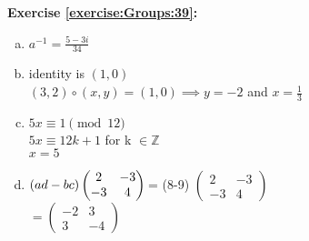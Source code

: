 \noindent\textbf{Exercise \ref{exercise:Groups:39}:}\\
\begin{enumerate}[(a)]
\item
$a^{-1}=\displaystyle\frac{5-3i}{34}$

 
\item
 identity is $(1,0)$\\
$(3,2)\circ(x,y)=(1,0)\implies y=-2$ and $x=\displaystyle\frac{1}{3}$

\item
$5x \equiv 1 \pmod{12}$\\
$5x \equiv 12k + 1$ for k $\in \mathbb{ Z}$\\
$x = 5$

\item
$(ad - bc)
\begin{pmatrix}
2 &-3 \\
-3 & 4
\end{pmatrix}\\
$= (8-9)
$\begin{pmatrix}
2 &-3 \\
-3 & 4
\end{pmatrix}$\\
$= \begin{pmatrix}
-2 & 3 \\
3 & -4
\end{pmatrix}$
\end{enumerate}

